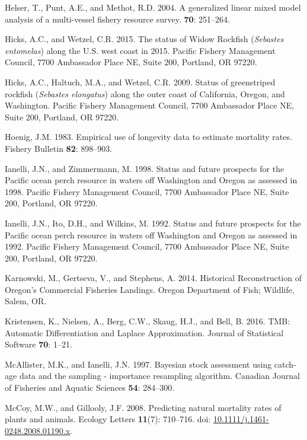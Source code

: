 \documentclass[12pt,]{article}
\begin{document}
\hypertarget{ref-helser_generalized_2004}{}
Helser, T., Punt, A.E., and Methot, R.D. 2004. A generalized linear
mixed model analysis of a multi-vessel fishery resource survey.
\textbf{70}: 251--264.

\hypertarget{ref-hicks_status_2015}{}
Hicks, A.C., and Wetzel, C.R. 2015. The status of Widow Rockfish
(\emph{Sebastes entomelas}) along the U.S. west coast in 2015. Pacific
Fishery Management Council, 7700 Ambassador Place NE, Suite 200,
Portland, OR 97220.

\hypertarget{ref-hicks_status_2009}{}
Hicks, A.C., Haltuch, M.A., and Wetzel, C.R. 2009. Status of
greenstriped rockfish (\emph{Sebastes elongatus}) along the outer coast
of California, Oregon, and Washington. Pacific Fishery Management
Council, 7700 Ambassador Place NE, Suite 200, Portland, OR 97220.

\hypertarget{ref-hoenig_empirical_1983}{}
Hoenig, J.M. 1983. Empirical use of longevity data to estimate mortality
rates. Fishery Bulletin \textbf{82}: 898--903.

\hypertarget{ref-ianelli_status_1998}{}
Ianelli, J.N., and Zimmermann, M. 1998. Status and future prospects for
the Pacific ocean perch resource in waters off Washington and Oregon as
assessed in 1998. Pacific Fishery Management Council, 7700 Ambassador
Place NE, Suite 200, Portland, OR 97220.

\hypertarget{ref-ianelli_status_1992}{}
Ianelli, J.N., Ito, D.H., and Wilkins, M. 1992. Status and future
prospects for the Pacific ocean perch resource in waters off Washington
and Oregon as assessed in 1992. Pacific Fishery Management Council, 7700
Ambassador Place NE, Suite 200, Portland, OR 97220.

\hypertarget{ref-karnowski_historical_2014}{}
Karnowski, M., Gertseva, V., and Stephens, A. 2014. Historical
Reconstruction of Oregon's Commercial Fisheries Landings. Oregon
Department of Fish; Wildlife, Salem, OR.

\hypertarget{ref-kristensen_tmb:_2016}{}
Kristensen, K., Nielsen, A., Berg, C.W., Skaug, H.J., and Bell, B. 2016.
TMB: Automatic Differentiation and Laplace Approximation. Journal of
Statistical Software \textbf{70}: 1--21.

\hypertarget{ref-mcallister_bayesian_1997}{}
McAllister, M.K., and Ianelli, J.N. 1997. Bayesian stock assessment
using catch-age data and the sampling - importance resampling algorithm.
Canadian Journal of Fisheries and Aquatic Sciences \textbf{54}:
284--300.

\hypertarget{ref-mccoy_predicting_2008}{}
McCoy, M.W., and Gillooly, J.F. 2008. Predicting natural mortality rates
of plants and animals. Ecology Letters \textbf{11}(7): 710--716. doi:
\href{https://doi.org/10.1111/j.1461-0248.2008.01190.x}{10.1111/j.1461-0248.2008.01190.x}.
\end{document}
